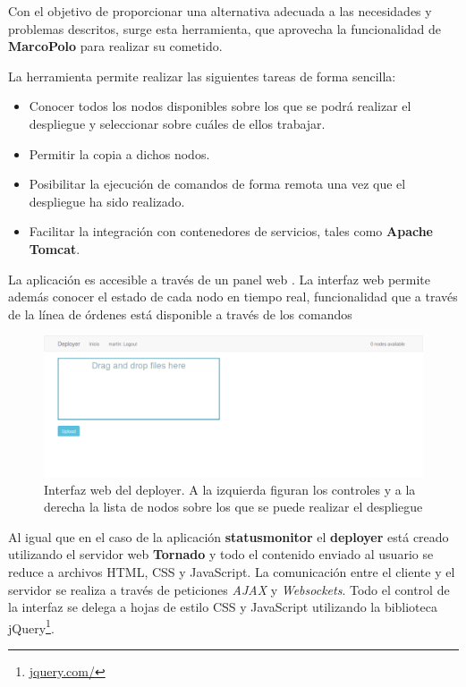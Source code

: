 Con el objetivo de proporcionar una alternativa adecuada a las necesidades y problemas descritos, surge esta herramienta, que aprovecha la funcionalidad de \textbf{MarcoPolo} para realizar su cometido.

La herramienta permite realizar las siguientes tareas de forma sencilla:

\begin{itemize}
\item Conocer todos los nodos disponibles sobre los que se podrá realizar el despliegue y seleccionar sobre cuáles de ellos trabajar.
\item Permitir la copia a dichos nodos.
\item Posibilitar la ejecución de comandos de forma remota una vez que el despliegue ha sido realizado.
\item Facilitar la integración con contenedores de servicios, tales como \textbf{Apache Tomcat}.
\end{itemize}

La aplicación es accesible a través de un panel web %
. La interfaz web permite además conocer el estado de cada nodo en tiempo real, funcionalidad que a través de la línea de órdenes está disponible a través de los comandos %

\begin{figure}[H]
\centering
\includegraphics[width=\textwidth]{Chapter5/Figures/deployer}
\caption[Interfaz web del deployer]{Interfaz web del deployer. A la izquierda figuran los controles y a la derecha la lista de nodos sobre los que se puede realizar el despliegue}
\label{fig:vista_deployer}
\end{figure}

Al igual que en el caso de la aplicación \textbf{statusmonitor} el \textbf{deployer} está creado utilizando el servidor web \textbf{Tornado} y todo el contenido enviado al usuario se reduce a archivos HTML, CSS y JavaScript. La comunicación entre el cliente y el servidor se realiza a través de peticiones \textit{AJAX} y \textit{Websockets}. Todo el control de la interfaz se delega a hojas de estilo CSS y JavaScript utilizando la biblioteca jQuery\footnote{\href{https://jquery.com/}{jquery.com/}}.

